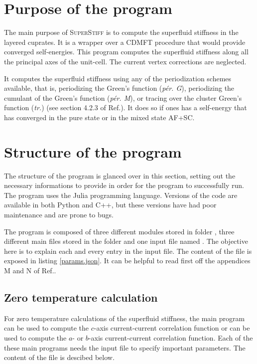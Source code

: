 \documentclass{article}
\begin{document}
\section{Purpose of the program}
\label{sec:Purpose}

The main purpose of \textsc{SuperStiff} is to compute the superfluid stiffness in the layered cuprates. It is a wrapper over a CDMFT procedure that would provide converged self-energies. This program computes the superfluid stiffness along all the principal axes of the unit-cell. The current vertex corrections are neglected. 

It computes the superfluid stiffness using any of the periodization schemes available, that is, periodizing the Green's function (\textit{pér. G}), periodizing the cumulant of the Green's function (\textit{pér. M}), or tracing over the cluster Green's function (\textit{tr.}) (see section 4.2.3 of Ref.\cite{simard_master}). It does so if ones has a self-energy that has converged in the pure state or in the mixed state AF+SC.

\section{Structure of the program}
\label{sec:structure_of_program}

The structure of the program is glanced over in this section, setting out the necessary informations to provide in order for the program to successfully run. The program uses the Julia programming language. Versions of the code are available in both Python and C++, but these versions have had poor maintenance and are prone to bugs.

The program is composed of three different modules stored in folder , three different main files stored in the folder  and one input file named . The objective here is to explain each and every entry in the input file. The content of the  file is exposed in listing \ref{params.json}. It can be helpful to read first off the appendices M and N of Ref.\cite{simard_master}.

\clearpage

\subsection{Zero temperature calculation}
\label{zero_T_calculation}

For zero temperature calculations of the superfluid stiffness, the main program  can be used to compute the $c$-axis current-current correlation function or  can be used to compute the $a$- or $b$-axis current-current correlation function. Each of the these main programs needs the input file  to specify important parameters. The content of the  file is descibed below.
\end{document}
